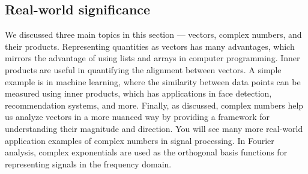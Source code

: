 \documentclass{ee102_notes}
\begin{document}
\subsection{Real-world significance}
We discussed three main topics in this section --- vectors, complex numbers, and their products.
Representing quantities as vectors has many advantages, which mirrors the advantage of using lists and arrays in computer programming. Inner products are useful in quantifying the alignment between vectors. A simple example is in machine learning, where the similarity between data points can be measured using inner products, which has applications in face detection, recommendation systems, and more. Finally, as discussed, complex numbers help us analyze vectors in a more nuanced way by providing a framework for understanding their magnitude and direction. You will see many more real-world application examples of complex numbers in signal processing. In Fourier analysis, complex exponentials are used as the orthogonal basis functions for representing signals in the frequency domain.
\end{document}
